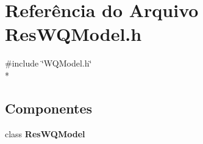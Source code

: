 \section{Referência do Arquivo Res\+W\+Q\+Model.\+h}
\label{_res_w_q_model_8h}
{\ttfamily \#include \char`\"{}W\+Q\+Model.\+h\char`\"{}}\\*
\subsection*{Componentes}
\begin{DoxyCompactItemize}
\item 
class {\bf Res\+W\+Q\+Model}
\end{DoxyCompactItemize}
